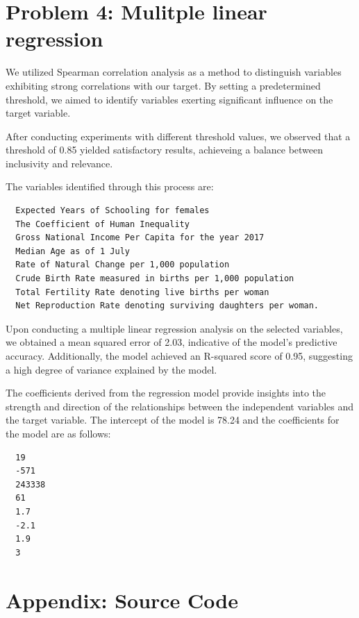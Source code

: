 \documentclass[a4paper]{article}
\begin{document}
\section*{Problem 4: Mulitple linear regression}

We utilized Spearman correlation analysis as a method to distinguish variables exhibiting strong correlations with our target. 
By setting a predetermined threshold, we aimed to identify variables exerting significant influence on the target variable.

After conducting experiments with different threshold values, we observed that a threshold of 0.85 yielded satisfactory results, achieveing a balance between inclusivity and relevance.

The variables identified through this process are: 

\begin{verbatim}
  Expected Years of Schooling for females 
  The Coefficient of Human Inequality 
  Gross National Income Per Capita for the year 2017
  Median Age as of 1 July
  Rate of Natural Change per 1,000 population
  Crude Birth Rate measured in births per 1,000 population
  Total Fertility Rate denoting live births per woman
  Net Reproduction Rate denoting surviving daughters per woman.
\end{verbatim}

Upon conducting a multiple linear regression analysis on the selected variables, we obtained a mean squared error of 2.03, indicative of the model's predictive accuracy. 
Additionally, the model achieved an R-squared score of 0.95, suggesting a high degree of variance explained by the model.

The coefficients derived from the regression model provide insights into the strength and direction of the relationships between the independent variables and the target variable.
The intercept of the model is 78.24 and the coefficients for the model are as follows:
\begin{verbatim}
  19
  -571
  243338
  61
  1.7
  -2.1
  1.9
  3
\end{verbatim}



\newpage


\printbibliography

\section*{Appendix: Source Code}




\end{document}
